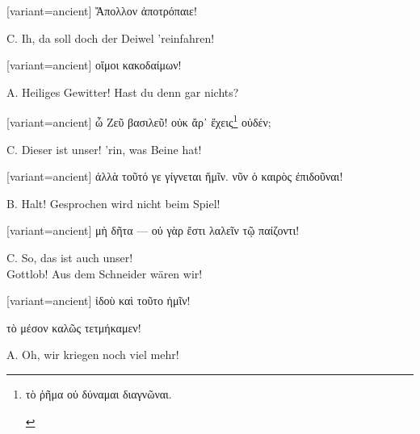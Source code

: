 \begin{greek}[variant=ancient]%
Ἄπολλον ἀποτρόπαιε!

\end{greek}%
\switchcolumn*

C. Ih, da soll doch der Deiwel 'reinfahren!

\switchcolumn

\begin{greek}[variant=ancient]%
οἴμοι κακοδαίμων!

\end{greek}%
\switchcolumn*

A. Heiliges Gewitter! Hast du denn gar nichts?

\switchcolumn

\begin{greek}[variant=ancient]%
ὦ Ζεῦ βασιλεῦ! οὐκ ἄρ᾽ ἔχεις\footnote{\begin{latin}%
\textgreek[variant=ancient]{τὸ ῥῆμα οὐ δύναμαι διαγνῶναι.}\end{latin}%
} οὐδέν;

\end{greek}%
\switchcolumn*

C. Dieser ist unser! 'rin, was Beine hat!

\switchcolumn

\begin{greek}[variant=ancient]%
ἀλλὰ τοῦτό γε γίγνεται ἥμῖν. νῦν ὁ καιρὸς ἐπιδοῦναι!

\end{greek}%
\switchcolumn*

B. Halt! Gesprochen wird nicht beim Spiel!

\switchcolumn

\begin{greek}[variant=ancient]%
μὴ δῆτα — οὐ γὰρ ἔστι λαλεῖν τῷ παίζοντι!

\end{greek}%
\switchcolumn*

C. So, das ist auch unser!\\
Gottlob! Aus dem Schneider wären wir!

\switchcolumn

\begin{greek}[variant=ancient]%
ἰδοὺ καὶ τοῦτο ἡμῖν!

τὸ μέσον καλῶς τετμήκαμεν!

\end{greek}%
\switchcolumn*

A. Oh, wir kriegen noch viel mehr!

